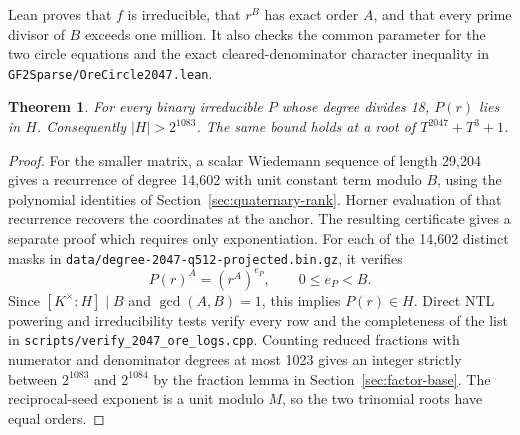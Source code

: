 \documentclass[11pt]{article}
\newtheorem{theorem}{Theorem}
\begin{document}
Lean proves that \(f\) is irreducible, that \(r^B\) has exact order
\(A\), and that every prime divisor of \(B\) exceeds one million.
It also checks the common parameter for the two circle equations and
the exact cleared-denominator character inequality in
\nolinkurl{GF2Sparse/OreCircle2047.lean}.

\begin{theorem}\label{thm:2047-first-table}
For every binary irreducible \(P\) whose degree divides 18, \(P(r)\)
lies in \(H\). Consequently \(|H|>2^{1083}\). The same bound holds
at a root of \(T^{2047}+T^3+1\).
\end{theorem}
\begin{proof}
For the smaller matrix, a scalar Wiedemann sequence of length 29,204
gives a recurrence of degree 14,602 with unit constant term modulo
\(B\), using the polynomial identities of Section~\ref{sec:quaternary-rank}.
Horner evaluation of that recurrence recovers the coordinates at
the anchor. The resulting certificate gives a separate proof which
requires only exponentiation. For each of the 14,602 distinct masks
in \nolinkurl{data/degree-2047-q512-projected.bin.gz}, it verifies
\[
                        P(r)^A=(r^A)^{e_P},\qquad 0\le e_P<B.
\]
Since \([K^\times:H]\mid B\) and \(\gcd(A,B)=1\), this implies
\(P(r)\in H\). Direct NTL powering and irreducibility tests verify
every row and the completeness of the list in
\nolinkurl{scripts/verify_2047_ore_logs.cpp}.
Counting reduced fractions with numerator and denominator degrees at
most 1023 gives an integer strictly between \(2^{1083}\) and
\(2^{1084}\) by the fraction lemma in Section~\ref{sec:factor-base}.
The reciprocal-seed exponent is a unit modulo \(M\), so the two
trinomial roots have equal orders.
\end{proof}
\end{document}
